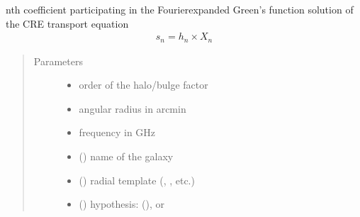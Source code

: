 \documentclass[letterpaper,10pt,english]{sphinxmanual}
\begin{document}
\begin{fulllineitems}
\label{\detokenize{diffsph:diffsph.pyflux.coeff}}
\sphinxAtStartPar
n\sphinxhyphen{}th coefficient participating in the Fourier\sphinxhyphen{}expanded Green’s function solution of the CRE transport equation
\begin{equation*}
\begin{split}s_n = h_n\times X_n\end{split}
\end{equation*}\begin{quote}\begin{description}
\item[{Parameters}] \leavevmode\begin{itemize}
\item {} 
\sphinxAtStartPar
{} \textendash{} order of the halo/bulge factor

\item {} 
\sphinxAtStartPar
{} \textendash{} angular radius in arcmin

\item {} 
\sphinxAtStartPar
{} \textendash{} frequency in GHz

\item {} 
\sphinxAtStartPar
{} () \textendash{} name of the galaxy

\item {} 
\sphinxAtStartPar
{} () \textendash{} radial template (, , etc.)

\item {} 
\sphinxAtStartPar
{} () \textendash{} hypothesis:  (),  or 


\end{itemize}
\end{description}
\end{quote}
\end{fulllineitems}
\end{document}
